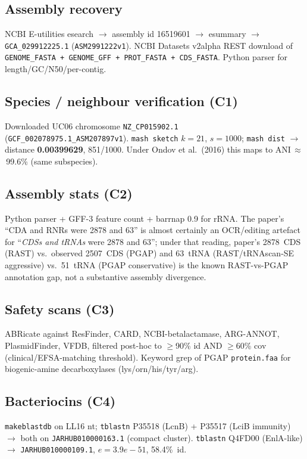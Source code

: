 \documentclass[11pt,a4paper]{article}
\begin{document}
\subsection{Assembly recovery}
NCBI E-utilities esearch $\to$ assembly id 16519601 $\to$ esummary $\to$ \texttt{GCA\_029912225.1} (\texttt{ASM2991222v1}). NCBI Datasets v2alpha REST download of \texttt{GENOME\_FASTA + GENOME\_GFF + PROT\_FASTA + CDS\_FASTA}. Python parser for length/GC/N50/per-contig.

\subsection{Species / neighbour verification (C1)}
Downloaded UC06 chromosome \texttt{NZ\_CP015902.1} (\texttt{GCF\_002078975.1\_ASM207897v1}). \texttt{mash sketch} $k{=}21$, $s{=}1000$; \texttt{mash dist} $\to$ distance \textbf{0.00399629}, 851/1000. Under Ondov et al.\ (2016) this maps to ANI\,$\approx$\,99.6\% (same subspecies).

\subsection{Assembly stats (C2)}
Python parser + GFF-3 feature count + barrnap 0.9 for rRNA. The paper's ``CDA and RNRs were 2878 and 63'' is almost certainly an OCR/editing artefact for ``\emph{CDSs and tRNAs} were 2878 and 63''; under that reading, paper's 2878~CDS (RAST) vs.\ observed 2507~CDS (PGAP) and 63~tRNA (RAST/tRNAscan-SE aggressive) vs.\ 51~tRNA (PGAP conservative) is the known RAST-vs-PGAP annotation gap, not a substantive assembly divergence.

\subsection{Safety scans (C3)}
ABRicate against ResFinder, CARD, NCBI-betalactamase, ARG-ANNOT, PlasmidFinder, VFDB, filtered post-hoc to $\geq$90\% id AND $\geq$60\% cov (clinical/EFSA-matching threshold). Keyword grep of PGAP \texttt{protein.faa} for biogenic-amine decarboxylases (lys/orn/his/tyr/arg).

\subsection{Bacteriocins (C4)}
\texttt{makeblastdb} on LL16 nt; \texttt{tblastn} P35518 (LcnB) + P35517 (LciB immunity) $\to$ both on \texttt{JARHUB010000163.1} (compact cluster). \texttt{tblastn} Q4FD00 (EnlA-like) $\to$ \texttt{JARHUB010000109.1}, $e{=}3.9e{-}51$, 58.4\%~id.
\end{document}
